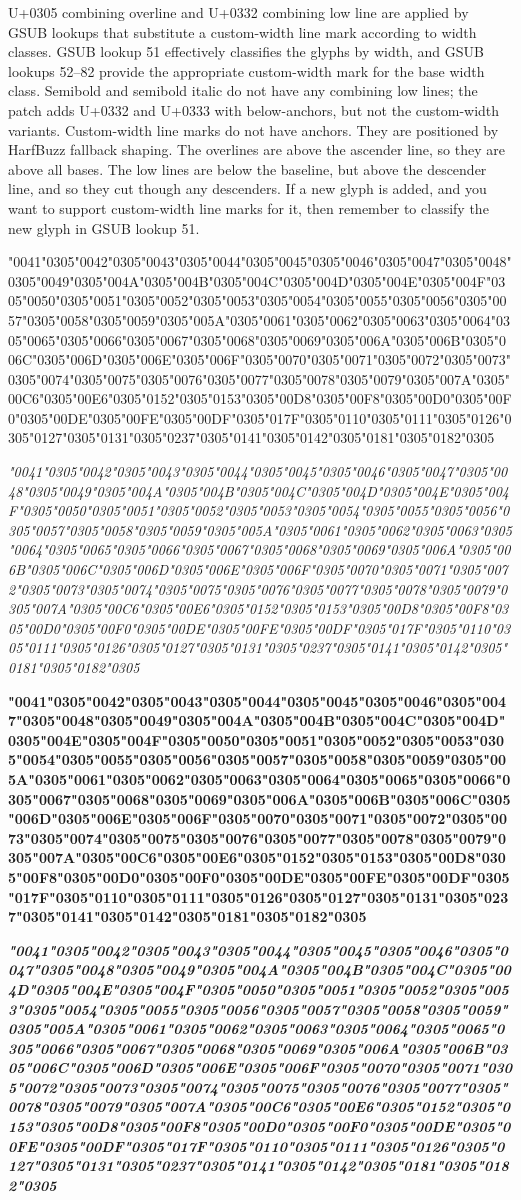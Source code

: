 \documentclass[landscape]{article}
\newcommand{\gs}{\hspace{0.5mm}}	%
\newcommand{\ribbi}[1]{#1\
	
	{\itshape #1}
	
	{\bfseries #1}
	
	{\itshape\bfseries #1}}
\begin{document}
U+0305 combining overline and U+0332 combining low line are applied by GSUB lookups that substitute a custom-width line mark according to width classes. 
GSUB lookup 51 effectively classifies the glyphs by width, and GSUB lookups 52--82 provide the appropriate custom-width mark for the base width class. 
Semibold and semibold italic do not have any combining low lines; the patch adds U+0332 and U+0333 with below-anchors, but not the custom-width variants. 
Custom-width line marks do not have anchors. 
They are positioned by HarfBuzz fallback shaping. 
The overlines are above the ascender line, so they are above all bases. 
The low lines are below the baseline, but above the descender line, and so they cut though any descenders.
If a new glyph is added, and you want to support custom-width line marks for it, then remember to classify the new glyph in GSUB lookup 51.

\ribbi{
	\char"0041\char"0305\gs \char"0042\char"0305\gs \char"0043\char"0305\gs \char"0044\char"0305\gs \char"0045\char"0305\gs \char"0046\char"0305\gs \char"0047\char"0305\gs \char"0048\char"0305\gs \char"0049\char"0305\gs \char"004A\char"0305\gs \char"004B\char"0305\gs \char"004C\char"0305\gs \char"004D\char"0305\gs \char"004E\char"0305\gs \char"004F\char"0305\gs \char"0050\char"0305\gs \char"0051\char"0305\gs \char"0052\char"0305\gs \char"0053\char"0305\gs \char"0054\char"0305\gs \char"0055\char"0305\gs \char"0056\char"0305\gs \char"0057\char"0305\gs \char"0058\char"0305\gs \char"0059\char"0305\gs \char"005A\char"0305\gs \char"0061\char"0305\gs \char"0062\char"0305\gs \char"0063\char"0305\gs \char"0064\char"0305\gs \char"0065\char"0305\gs \char"0066\char"0305\gs \char"0067\char"0305\gs \char"0068\char"0305\gs \char"0069\char"0305\gs \char"006A\char"0305\gs \char"006B\char"0305\gs \char"006C\char"0305\gs \char"006D\char"0305\gs \char"006E\char"0305\gs \char"006F\char"0305\gs \char"0070\char"0305\gs \char"0071\char"0305\gs \char"0072\char"0305\gs \char"0073\char"0305\gs \char"0074\char"0305\gs \char"0075\char"0305\gs \char"0076\char"0305\gs \char"0077\char"0305\gs \char"0078\char"0305\gs \char"0079\char"0305\gs \char"007A\char"0305\gs \char"00C6\char"0305\gs \char"00E6\char"0305\gs \char"0152\char"0305\gs \char"0153\char"0305\gs \char"00D8\char"0305\gs \char"00F8\char"0305\gs \char"00D0\char"0305\gs \char"00F0\char"0305\gs \char"00DE\char"0305\gs \char"00FE\char"0305\gs \char"00DF\char"0305\gs \char"017F\char"0305\gs \char"0110\char"0305\gs \char"0111\char"0305\gs \char"0126\char"0305\gs \char"0127\char"0305\gs \char"0131\char"0305\gs \char"0237\char"0305\gs \char"0141\char"0305\gs \char"0142\char"0305\gs \char"0181\char"0305\gs \char"0182\char"0305
}
\end{document}
